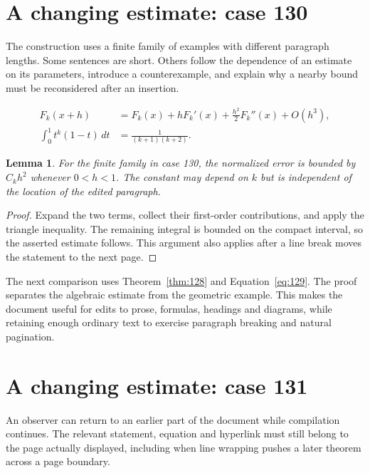 \documentclass[a4paper,10pt]{article}
\newtheorem{lemma}[theorem]{Lemma}
\begin{document}
\lipsum[18]

\section{A changing estimate: case 130}\label{unit:129}
The construction uses a finite family of examples with different paragraph lengths. Some sentences are short. Others follow the dependence of an estimate on its parameters, introduce a counterexample, and explain why a nearby bound must be reconsidered after an insertion.

\lipsum[28-29]
\begin{align}\label{eq:129}
 F_k(x+h)&=F_k(x)+hF_k'(x)+\frac{h^2}{2}F_k''(x)+O(h^3),\\
 \int_0^1 t^k(1-t)\,dt&=\frac{1}{(k+1)(k+2)}.
\end{align}
\begin{lemma}\label{thm:129}
For the finite family in case 130, the normalized error is bounded by $C_k h^2$ whenever $0<h<1$. The constant may depend on $k$ but is independent of the location of the edited paragraph.
\end{lemma}
\begin{proof}
Expand the two terms, collect their first-order contributions, and apply the
triangle inequality. The remaining integral is bounded on the compact interval,
so the asserted estimate follows. This argument also applies after a line break
moves the statement to the next page.
\end{proof}
\begin{center}
\end{center}
The next comparison uses Theorem~\ref{thm:128} and Equation~\ref{eq:129}. The proof separates the algebraic estimate from the geometric example. This makes the document useful for edits to prose, formulas, headings and diagrams, while retaining enough ordinary text to exercise paragraph breaking and natural pagination.

\lipsum[23]

\section{A changing estimate: case 131}\label{unit:130}
An observer can return to an earlier part of the document while compilation continues. The relevant statement, equation and hyperlink must still belong to the page actually displayed, including when line wrapping pushes a later theorem across a page boundary.
\end{document}
